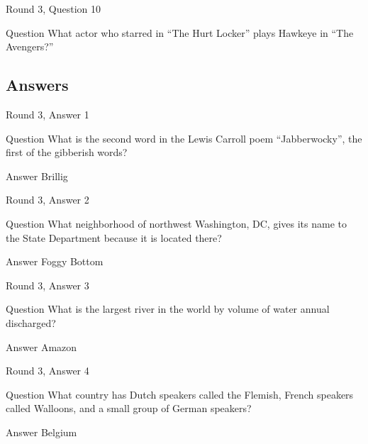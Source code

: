 \documentclass[11pt]{beamer}
\begin{document}
\begin{frame}{Round 3, Question 10}
\begin{block}{Question}
What actor who starred in ``The Hurt Locker'' plays Hawkeye in ``The Avengers?''
\end{block}
\end{frame}
    
\subsection{Answers}

\begin{frame}{Round 3, Answer 1}
\begin{block}{Question}
What is the second word in the Lewis Carroll poem ``Jabberwocky'', the first of the gibberish words\@?
\end{block}
\pause{}
\begin{block}{Answer}
Brillig
\end{block}
\end{frame}
    

\begin{frame}{Round 3, Answer 2}
\begin{block}{Question}
What neighborhood of northwest Washington, DC, gives its name to the State Department because it is located there\@?
\end{block}
\pause{}
\begin{block}{Answer}
Foggy Bottom
\end{block}
\end{frame}
    

\begin{frame}{Round 3, Answer 3}
\begin{block}{Question}
What is the largest river in the world by volume of water annual discharged\@?
\end{block}
\pause{}
\begin{block}{Answer}
Amazon
\end{block}
\end{frame}
    

\begin{frame}{Round 3, Answer 4}
\begin{block}{Question}
What country has Dutch speakers called the Flemish, French speakers called Walloons, and a small group of German speakers\@?
\end{block}
\pause{}
\begin{block}{Answer}
Belgium
\end{block}
\end{frame}
    
\end{document}

